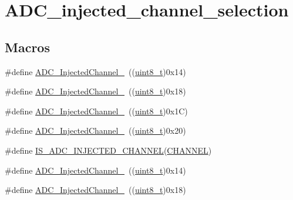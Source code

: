 \hypertarget{group___a_d_c__injected__channel__selection}{}\section{A\+D\+C\+\_\+injected\+\_\+channel\+\_\+selection}
\label{group___a_d_c__injected__channel__selection}
\subsection*{Macros}
\begin{DoxyCompactItemize}
\item 
\#define \hyperlink{group___a_d_c__injected__channel__selection_ga8792d4ae0fa82dd317252c72815684ba}{A\+D\+C\+\_\+\+Injected\+Channel\+\_}~((\hyperlink{_p_e___types_8h_aba7bc1797add20fe3efdf37ced1182c5}{uint8\+\_\+t})0x14)
\item 
\#define \hyperlink{group___a_d_c__injected__channel__selection_ga2e322fccc7de16a0e79be573f5b1211c}{A\+D\+C\+\_\+\+Injected\+Channel\+\_}~((\hyperlink{_p_e___types_8h_aba7bc1797add20fe3efdf37ced1182c5}{uint8\+\_\+t})0x18)
\item 
\#define \hyperlink{group___a_d_c__injected__channel__selection_ga6bf03d805645b942bdcc53504e772cf1}{A\+D\+C\+\_\+\+Injected\+Channel\+\_}~((\hyperlink{_p_e___types_8h_aba7bc1797add20fe3efdf37ced1182c5}{uint8\+\_\+t})0x1\+C)
\item 
\#define \hyperlink{group___a_d_c__injected__channel__selection_ga31d18bbcfa7b685e90c3a1313d9c6406}{A\+D\+C\+\_\+\+Injected\+Channel\+\_}~((\hyperlink{_p_e___types_8h_aba7bc1797add20fe3efdf37ced1182c5}{uint8\+\_\+t})0x20)
\item 
\#define \hyperlink{group___a_d_c__injected__channel__selection_gae0bbfb5dbad0fbac8b672db6f63cf8d0}{I\+S\+\_\+\+A\+D\+C\+\_\+\+I\+N\+J\+E\+C\+T\+E\+D\+\_\+\+C\+H\+A\+N\+N\+EL}(\hyperlink{samr21__xpro_200std__low__power__mode_200std__low__power__mode_8c_ace6a11e892466500d47d1f45f042bc53}{C\+H\+A\+N\+N\+EL})
\item 
\#define \hyperlink{group___a_d_c__injected__channel__selection_ga8792d4ae0fa82dd317252c72815684ba}{A\+D\+C\+\_\+\+Injected\+Channel\+\_}~((\hyperlink{_p_e___types_8h_aba7bc1797add20fe3efdf37ced1182c5}{uint8\+\_\+t})0x14)
\item 
\#define \hyperlink{group___a_d_c__injected__channel__selection_ga2e322fccc7de16a0e79be573f5b1211c}{A\+D\+C\+\_\+\+Injected\+Channel\+\_}~((\hyperlink{_p_e___types_8h_aba7bc1797add20fe3efdf37ced1182c5}{uint8\+\_\+t})0x18)

\end{DoxyCompactItemize}
